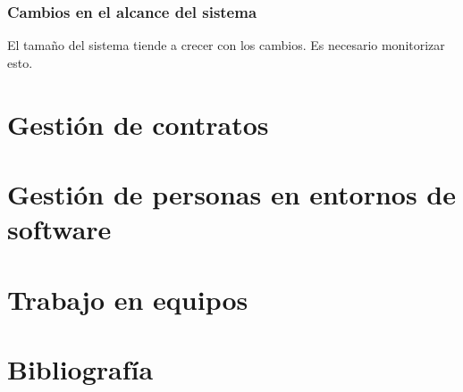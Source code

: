 \documentclass[12pt]{article}
\begin{document}
\subsubsection{Cambios en el alcance del sistema}
\label{9.9.3}

{El tamaño del sistema tiende a crecer con los cambios. Es necesario monitorizar esto.}

\newpage
\section{Gestión de contratos}
\label{10.0.0}


\newpage
\section[Gestión de personas en entornos de software]{Gestión de personas en entornos de \\software}
\label{11.0.0}


\newpage
\section{Trabajo en equipos}
\label{12.0.0}


\newpage
\section{Bibliografía}
\label{bibliografia}
\nocite{*}
\begingroup
\renewcommand{\section}[2]{}%
\printbibliography
\endgroup
\end{document}
